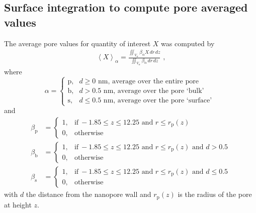 \documentclass[journal=ancac3, manuscript=suppinfo, etalmode=truncate,maxauthors=0]{achemso}
\begin{document}
\newpage
\subsection{Surface integration to compute pore averaged values}

The average pore values for quantity of interest $X$ was computed by
%
\begin{align}
  \left< X \right>_{\alpha} =
    \displaystyle\frac{\displaystyle\iint_{V_{\alpha}} \beta_{\alpha} X \,dr\,dz}
                      {\displaystyle\iint_{V_{\alpha}} \beta_{\alpha} \,dr\,dz}
  \text{ ,}
\end{align}
%
where
%
\begin{equation}
  \alpha=
  \begin{cases}
    \text{p}, & d \ge 0  \text{~nm} \text{, average over the entire pore} \\
    \text{b}, & d > 0.5  \text{~nm} \text{, average over the pore `bulk' }  \\
    \text{s}, & d \le 0.5\text{~nm} \text{, average over the pore `surface' }
  \end{cases}
\end{equation}
%
and
%
\begin{align}
  \beta_{\text{p}} &=
  \begin{cases}
    1, & \text{if}\ -1.85\le z \le 12.25  \text{ and } r \le r_\text{p}(z) \\
    0, & \text{otherwise}
  \end{cases} \\
  \beta_{\text{b}} &=
  \begin{cases}
  1, & \text{if}\ -1.85\le z \le 12.25  \text{ and } r \le r_\text{p}(z) \text{ and } d > 0.5 \\
  0, & \text{otherwise}
  \end{cases} \\
  \beta_{\text{s}} &=
  \begin{cases}
  1, & \text{if}\ -1.85\le z \le 12.25  \text{ and } r \le r_\text{p}(z) \text{ and } d \le 0.5 \\
  0, & \text{otherwise}
  \end{cases}
\end{align}
%
with $d$ the distance from the nanopore wall and $r_\text{p}(z)$ is the radius of the pore at height $z$.


\newpage
%
\end{document}

